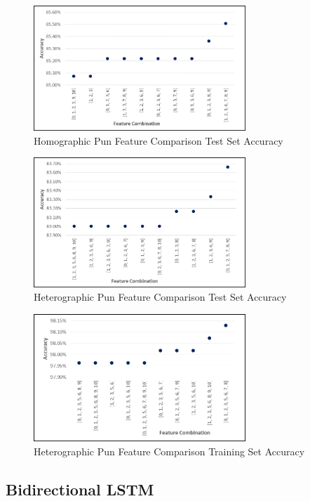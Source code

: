 \documentclass{article}
\begin{document}
\begin{figure}
  \centering
  \includegraphics[width=8cm]{figures/Accuracy_on_Test_Set_for_Homographic_Pun.png}
  \caption{Homographic Pun Feature Comparison Test Set Accuracy}\label{fig:ACC_Test_Homo}
\end{figure}

\begin{figure}
  \centering
  \includegraphics[width=8cm]{figures/Accuracy_on_Test_Set_for_Heterographic_Pun.png}
  \caption{Heterographic Pun Feature Comparison Test Set Accuracy}\label{fig:ACC_Test_Hetero}
\end{figure}

\begin{figure}
  \centering
  \includegraphics[width=8cm]{figures/Accuracy_on_Training_Set_for_Heterographic_Pun.png}
  \caption{Heterographic Pun Feature Comparison Training Set Accuracy}\label{fig:ACC_Train_Hetero}
\end{figure}

\subsection{Bidirectional LSTM}
\end{document}
